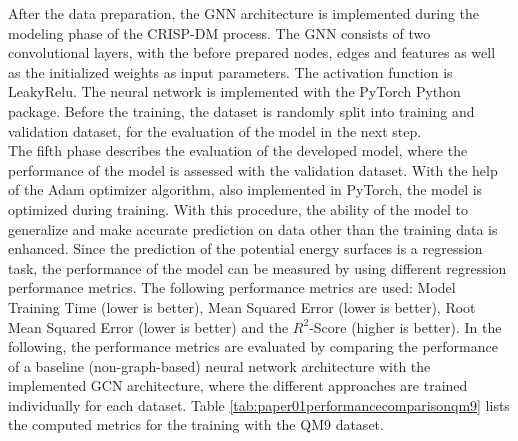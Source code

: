 After the data preparation, the GNN architecture is implemented during the modeling phase of the CRISP-DM process. The GNN consists of two convolutional layers, with the before prepared nodes, edges and features as well as the initialized weights as input parameters. The activation function is LeakyRelu. The neural network is implemented with the PyTorch Python package. Before the training, the dataset is randomly split into training and validation dataset, for the evaluation of the model in the next step.\\

The fifth phase describes the evaluation of the developed model, where the performance of the model is assessed with the validation dataset. With the help of the Adam optimizer algorithm, also implemented in PyTorch, the model is optimized during training. With this procedure, the ability of the model to generalize and make accurate prediction on data other than the training data is enhanced. Since the prediction of the potential energy surfaces is a regression task, the performance of the model can be measured by using different regression performance metrics. The following performance metrics are used: Model Training Time (lower is better), Mean Squared Error (lower is better), Root Mean Squared Error (lower is better) and the $R^2$-Score (higher is better). In the following, the performance metrics are evaluated by comparing the performance of a baseline (non-graph-based) neural network architecture with the implemented GCN architecture, where the different approaches are trained individually for each dataset. Table \ref{tab:paper01performancecomparisonqm9} lists the computed metrics for the training with the QM9 dataset.

\begin{table}[h!]
    \centering
    \captionsetup{justification=centering}
       \caption[Comparison of performance metrics of the developed model (QM-9 dataset)]{\label{tab:paper01performancecomparisonqm9} Comparison of performance metrics of the developed model [QM-9 dataset]}
\end{table}

